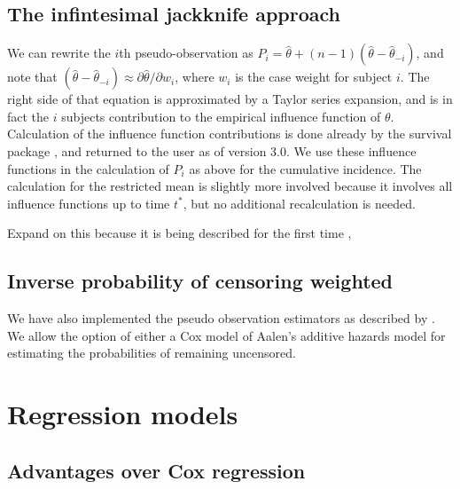 \documentclass[
]{article}
\begin{document}
\citet{andersen_pseudo-observations_2010}

\hypertarget{the-infintesimal-jackknife-approach}{%
\subsection{The infintesimal jackknife
approach}\label{the-infintesimal-jackknife-approach}}

We can rewrite the \(i\)th pseudo-observation as
\(P_i = \hat{\theta} + (n - 1) (\hat{\theta} - \hat{\theta}_{-i})\), and
note that
\((\hat{\theta} - \hat{\theta}_{-i}) \approx \partial \hat{\theta}/\partial w_i\),
where \(w_i\) is the case weight for subject \(i\). The right side of
that equation is approximated by a Taylor series expansion, and is in
fact the \(i\) subjects contribution to the empirical influence function
of \(\theta\). Calculation of the influence function contributions is
done already by the survival package \citep{survival-package}, and
returned to the user as of version 3.0. We use these influence functions
in the calculation of \(P_i\) as above for the cumulative incidence. The
calculation for the restricted mean is slightly more involved because it
involves all influence functions up to time \(t^*\), but no additional
recalculation is needed.

Expand on this because it is being described for the first time
\citet{jaeckel1972infinitesimal}, \citet{efron1992bootstrap}

\hypertarget{inverse-probability-of-censoring-weighted}{%
\subsection{Inverse probability of censoring
weighted}\label{inverse-probability-of-censoring-weighted}}

We have also implemented the pseudo observation estimators as described
by \citet{overgaard2019pseudo}. We allow the option of either a Cox
model of Aalen's additive hazards model for estimating the probabilities
of remaining uncensored.

\hypertarget{regression-models}{%
\section{Regression models}\label{regression-models}}

\hypertarget{advantages-over-cox-regression}{%
\subsection{Advantages over Cox
regression}\label{advantages-over-cox-regression}}
\end{document}
